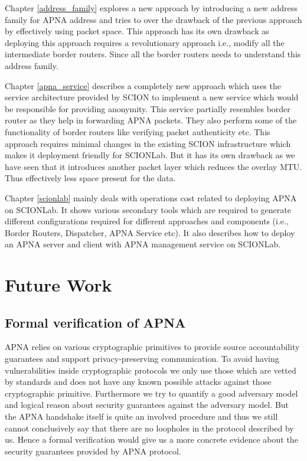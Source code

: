 Chapter \ref{address_family} explores a new approach by introducing a new address family for APNA address and tries to over the drawback of the previous approach by effectively using packet space. This approach has its own drawback as deploying this approach requires a revolutionary approach i.e., modify all the intermediate border routers. Since all the border routers needs to understand this address family. 

Chapter \ref{apna_service} describes a completely new approach which uses the service architecture provided by SCION to implement a new service which would be responsible for providing anonymity. This service partially resembles border router as they help in forwarding APNA packets. They also perform some of the functionality of border routers like verifying packet authenticity etc. This approach requires minimal changes in the existing SCION infrastructure which makes it deployment friendly for SCIONLab. But it has its own drawback as we have seen that it introduces another packet layer which reduces the overlay MTU. Thus effectively less space present for the data.

Chapter \ref{scionlab} mainly deals with operations cost related to deploying APNA on SCIONLab. It shows various secondary tools which are required to generate different configurations required for different approaches and components (i.e., Border Routers, Dispatcher, APNA Service etc). It also describes how to deploy an APNA server and client with APNA management service on SCIONLab.

\section{Future Work}

\subsection{Formal verification of APNA}
APNA relies on various cryptographic primitives to provide source accountability guarantees and support privacy-preserving communication. To avoid having vulnerabilities inside cryptographic protocols we only use those which are vetted by standards and does not have any known possible attacks against those cryptographic primitive. Furthermore we try to quantify a good adversary model and logical reason about security guarantees against the adversary model. But the APNA handshake itself is quite an involved procedure and thus we still cannot conclusively say that there are no loopholes in the protocol described by us. Hence a formal verification would give us a more concrete evidence about the security guarantees provided by APNA protocol.

